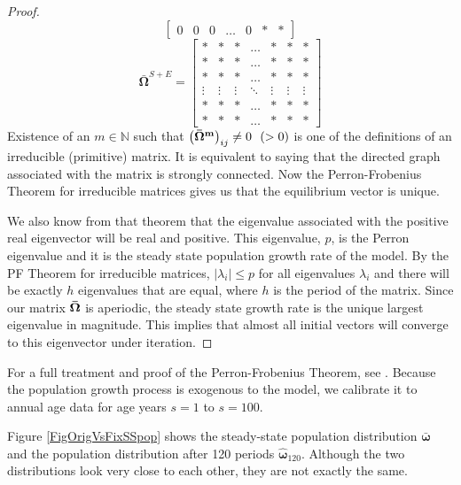 \documentclass[letterpaper,12pt]{article}
\theoremstyle{definition}
\begin{document}
\begin{proof}
$$\begin{bmatrix}
        0 & 0 & 0 & \hdots & 0 & * & *
      \end{bmatrix}
      $$
      $$\bm{\bar{\Omega}}^{S+E} =
      \begin{bmatrix}
        * & *  & * & \hdots & * & * & *\\
        * & * & * & \hdots & * & * & * \\
        * & * & * & \hdots & * & * & * \\
        \vdots & \vdots & \vdots & \ddots & \vdots & \vdots & \vdots \\
        * & * & * & \hdots & * & * & * \\
        * & * & * & \hdots & * & * & *
      \end{bmatrix}
      $$
      Existence of an $m \in \mathbb N $ such that $\left(\bf\bar{\Omega}^m\right)_{ij} \neq 0 ~~ ( > 0)$ is one of the definitions of an irreducible (primitive) matrix. It is equivalent to saying that the directed graph associated with the matrix is strongly connected. Now the Perron-Frobenius Theorem for irreducible matrices gives us that the equilibrium vector is unique.

      We also know from that theorem that the eigenvalue associated with the positive real eigenvector will be real and positive. This eigenvalue, $p$, is the Perron eigenvalue and it is the steady state population growth rate of the model. By the PF Theorem for irreducible matrices, $| \lambda_i | \leq p$ for all eigenvalues $\lambda_i$ and there will be exactly $h$ eigenvalues that are equal, where $h$ is the period of the matrix. Since our matrix $\bf\bar{\Omega}$ is aperiodic, the steady state growth rate is the unique largest eigenvalue in magnitude. This implies that almost all initial vectors will converge to this eigenvector under iteration.
    \end{proof}

    For a full treatment and proof of the Perron-Frobenius Theorem, see \citet{Suzumura:1983}. Because the population growth process is exogenous to the model, we calibrate it to annual age data for age years $s=1$ to $s=100$.

    Figure \ref{FigOrigVsFixSSpop} shows the steady-state population distribution $\bm{\bar{\omega}}$ and the population distribution after 120 periods $\bm{\hat{\omega}}_{120}$. Although the two distributions look very close to each other, they are not exactly the same.
\end{document}
